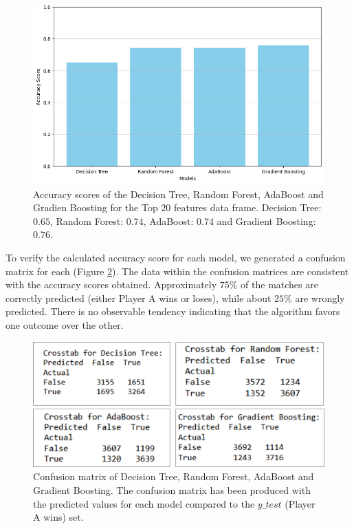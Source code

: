 \documentclass[preprint,aps,nofootinbib,a4paper,superscriptaddress,longbibliography,amsfonts,amssymb,amsmath,titlepage]{revtex4-2}
\begin{document}
%
\begin{figure}[h]
\includegraphics[width=\textwidth]{pictures/accuracy-score-models.png}
\caption{Accuracy scores of the Decision Tree, Random Forest, AdaBoost and Gradien Boosting for the Top 20 features data frame. Decision Tree: $0.65$, Random Forest: $0.74$, AdaBoost: $0.74$ and Gradient Boosting: $0.76$.}
\label{accuracy-score-models}
\end{figure}

To verify the calculated accuracy score for each model, we generated a confusion matrix for each (Figure \ref{confusion-matrix}). The data within the confusion matrices are consistent with the accuracy scores obtained. Approximately $75 \%$ of the matches are correctly predicted (either Player A wins or loses), while about $25 \%$ are wrongly predicted. There is no observable tendency indicating that the algorithm favors one outcome over the other.
%
\begin{figure}[h]
    \centering
    \includegraphics[width=\textwidth]{pictures/confusion-matrix.png}
    \caption{Confusion matrix of Decision Tree, Random Forest, AdaBoost and Gradient Boosting. The confusion matrix has been produced with the predicted values for each model compared to the $y\_test$ (Player A wins) set.}
    \label{confusion-matrix}
\end{figure}
\end{document}
